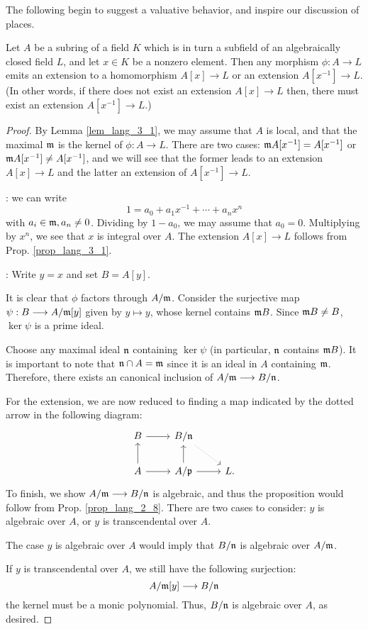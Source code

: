 The following begin to suggest a valuative behavior, and inspire 
our discussion of places.

\begin{prop}\label{thm_lang_3_2}
Let $A$ be a subring of a field $K$ which is in turn a subfield 
of an algebraically closed field $L$, and let $x \in K$ be a 
nonzero element. Then any morphism $\phi: A \to L$ emits an 
extension to a homomorphism $A[x] \to L$ or an extension 
$A[x^{-1}] \to L$. (In other words, if there does not exist an 
extension $A[x] \to L$ then, there must exist an extension 
$A[x^{-1}] \to L$.)
\end{prop}
\begin{proof}
By Lemma \ref{lem_lang_3_1}, we may assume that $A$ is local, and
that the maximal $\mathfrak{m}$ is the kernel of $\phi: A \to L$.
There are two cases: $\mathfrak{m}A[x^{-1}] = A[x^{-1}]$ or 
$\mathfrak{m}A[x^{-1}] \neq A[x^{-1}]$, and we will see that the former
leads to an extension $A[x] \to L$ and the latter an extension of
$A[x^{-1}] \to L$.

: we can write
\[
1 = a_0 + a_1x^{-1} + \cdots + a_nx^{n}
\]
with $a_i \in \mathfrak{m}, a_n \neq 0$. Dividing by $1 - a_0$, we 
may assume that $a_0 = 0$. Multiplying by $x^n$, we see that $x$ 
is integral over $A$. The extension $A[x] \to L$ follows from 
Prop. \ref{prop_lang_3_1}.

: Write $y = x$ 
and set $B = A[y]$. 

It is clear that $\phi$ factors through $A/\mathfrak{m}$. Consider 
the surjective map $\psi: B \longrightarrow A/\mathfrak{m}[y]$ given by $y
\mapsto y$, whose kernel contains $\mathfrak{m}B$. Since $\mathfrak{m}B 
\neq B$, $\ker \psi$ is a prime ideal.

Choose any maximal ideal $\mathfrak{n}$ containing $\ker \psi$ (in 
particular, $\mathfrak{n}$ contains $\mathfrak{m}B$). It is important
to note that $\mathfrak{n} \cap A = \mathfrak{m}$ since it is an ideal 
in $A$ containing $\mathfrak{m}$. Therefore, there exists an 
canonical inclusion of $A/\mathfrak{m} \longrightarrow B/\mathfrak{n}$.

For the extension, we are now reduced to finding a map indicated 
by the dotted arrow in the following diagram:
\[
\begin{tikzcd}
B \arrow{r} 
& B/\ideal{n}\arrow[dotted]{rd} \\
A \arrow{r} \arrow{u}
& A/\ideal{p} \arrow{r}\arrow{u}
& L.
\end{tikzcd}
\]
To finish, we show $A/\mathfrak{m} \longrightarrow B/\mathfrak{n}$ is algebraic, and
thus the proposition would follow from Prop. \ref{prop_lang_2_8}.
There are two cases to consider: $y$ is algebraic over $A$, or
$y$ is transcendental over $A$.

The case $y$ is algebraic over $A$ would imply that $B/\mathfrak{n}$
is algebraic over $A/\mathfrak{m}$.

If $y$ is transcendental over $A$, we still have the following
surjection:
\[
A/\mathfrak{m}[y] \longrightarrow B/\mathfrak{n}
\]
the kernel must be a monic polynomial. Thus, $B/\mathfrak{n}$ is 
algebraic over $A$, as desired.
\end{proof}
